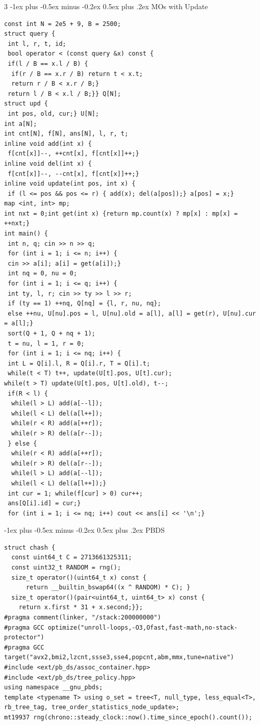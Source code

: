 \documentclass[8pt,a4paper,onesided]{article}
\makeatletter
\renewcommand{\subsection}{\@startsection{subsection}{2}{0mm}
    {-1ex plus -0.5ex minus -0.2ex} %
    {0.5ex plus .2ex}                %
    {\normalfont\large\bfseries}}    %
\makeatother
\begin{document}
\begin{multicols}{3}
\subsection{MOs with Update}
\begin{verbatim}
const int N = 2e5 + 9, B = 2500;
struct query {
 int l, r, t, id;
 bool operator < (const query &x) const {
 if(l / B == x.l / B) {
  if(r / B == x.r / B) return t < x.t;
  return r / B < x.r / B;}
 return l / B < x.l / B;}} Q[N];
struct upd {
 int pos, old, cur;} U[N];
int a[N];
int cnt[N], f[N], ans[N], l, r, t;
inline void add(int x) {
 f[cnt[x]]--, ++cnt[x], f[cnt[x]]++;}
inline void del(int x) {
 f[cnt[x]]--, --cnt[x], f[cnt[x]]++;}
inline void update(int pos, int x) {
 if (l <= pos && pos <= r) { add(x); del(a[pos]);} a[pos] = x;}
map <int, int> mp;
int nxt = 0;int get(int x) {return mp.count(x) ? mp[x] : mp[x] = ++nxt;}
int main() {
 int n, q; cin >> n >> q;
 for (int i = 1; i <= n; i++) {
 cin >> a[i]; a[i] = get(a[i]);}
 int nq = 0, nu = 0;
 for (int i = 1; i <= q; i++) {
 int ty, l, r; cin >> ty >> l >> r;
 if (ty == 1) ++nq, Q[nq] = {l, r, nu, nq};
 else ++nu, U[nu].pos = l, U[nu].old = a[l], a[l] = get(r), U[nu].cur = a[l];}
 sort(Q + 1, Q + nq + 1);
 t = nu, l = 1, r = 0;
 for (int i = 1; i <= nq; i++) {
 int L = Q[i].l, R = Q[i].r, T = Q[i].t;
 while(t < T) t++, update(U[t].pos, U[t].cur);
while(t > T) update(U[t].pos, U[t].old), t--;
 if(R < l) {
  while(l > L) add(a[--l]);
  while(l < L) del(a[l++]);
  while(r < R) add(a[++r]);
  while(r > R) del(a[r--]);
 } else {
  while(r < R) add(a[++r]);
  while(r > R) del(a[r--]);
  while(l > L) add(a[--l]);
  while(l < L) del(a[l++]);}
 int cur = 1; while(f[cur] > 0) cur++;
 ans[Q[i].id] = cur;}
 for (int i = 1; i <= nq; i++) cout << ans[i] << '\n';}
\end{verbatim}
\subsection{PBDS}
\begin{verbatim}
struct chash {
  const uint64_t C = 2713661325311;
  const uint32_t RANDOM = rng();
  size_t operator()(uint64_t x) const {
      return __builtin_bswap64((x ^ RANDOM) * C); }
  size_t operator()(pair<uint64_t, uint64_t> x) const { 
    return x.first * 31 + x.second;}};
#pragma comment(linker, "/stack:200000000")
#pragma GCC optimize("unroll-loops,-O3,Ofast,fast-math,no-stack-protector")
#pragma GCC target("avx2,bmi2,lzcnt,ssse3,sse4,popcnt,abm,mmx,tune=native")
#include <ext/pb_ds/assoc_container.hpp>
#include <ext/pb_ds/tree_policy.hpp>
using namespace __gnu_pbds;
template <typename T> using o_set = tree<T, null_type, less_equal<T>, rb_tree_tag, tree_order_statistics_node_update>;
mt19937 rng(chrono::steady_clock::now().time_since_epoch().count());
\end{verbatim}

\end{multicols}
\end{document}

